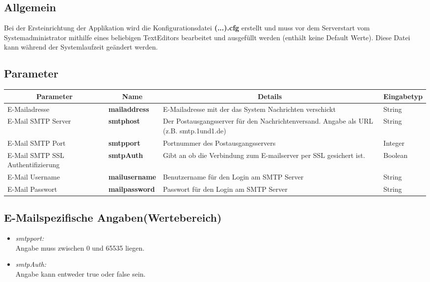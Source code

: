 \subsection{Allgemein}
Bei der Ersteinrichtung der Applikation wird die Konfigurationsdatei \textbf{(...).cfg} erstellt und muss vor dem Serverstart vom Systemadministrator mithilfe eines beliebigen TextEditors bearbeitet und ausgefüllt werden (enthält keine Default Werte). Diese Datei kann während der Systemlaufzeit geändert werden.

\subsection{Parameter}
\begin{center}
	\begin{longtable}{|p{4cm} | p{3cm}| p{7cm} | p{2cm} |}
		\hline
		\multicolumn{1}{|c|}{\textbf{Parameter}} & \multicolumn{1}{c|}{\textbf{Name}} & \multicolumn{1}{c|}{\textbf{Details}} & \multicolumn{1}{c|}{\textbf{Eingabetyp}}
		\\ \hline
		E-Mailadresse & \textbf{mailaddress} & E-Mailadresse mit der das System Nachrichten verschickt & String \\ \hline
		E-Mail SMTP Server & \textbf{smtphost} & Der Postausgangsserver für den Nachrichtenversand. Angabe als URL (z.B. smtp.1und1.de) & String \\ \hline
		E-Mail SMTP Port & \textbf{smtpport} & Portnummer des Postausgangsservers & Integer \\ \hline
		E-Mail SMTP SSL Authentifizierung & \textbf{smtpAuth} & Gibt an ob die Verbindung zum E-mailserver per SSL gesichert ist. & Boolean  \\ \hline
		E-Mail Username & \textbf{mailusername} & Benutzername für den Login am SMTP Server & String \\ \hline
		E-Mail Passwort & \textbf{mailpassword} & Passwort für den Login am SMTP Server & String \\ \hline
		
	\end{longtable}
\end{center}
\subsection{E-Mailspezifische Angaben(Wertebereich)}

\begin{itemize}
	\item \emph{smtpport:}\\
	Angabe muss zwischen 0 und 65535 liegen.
	\item \emph{smtpAuth:}\\
	Angabe kann entweder true oder false sein.
\end{itemize}


